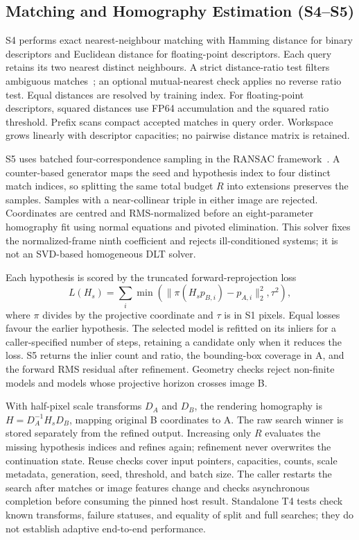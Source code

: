 \subsection{Matching and Homography Estimation (S4--S5)}
\label{sec:s4-s5}
S4 performs exact nearest-neighbour matching with Hamming distance for binary
descriptors and Euclidean distance for floating-point descriptors. Each query
retains its two nearest distinct neighbours. A strict distance-ratio test
filters ambiguous matches~\cite{lowe2004sift}; an optional mutual-nearest check
applies no reverse ratio test. Equal distances are resolved by training index.
For floating-point descriptors, squared distances use FP64 accumulation and
the squared ratio threshold. Prefix scans compact accepted matches in query
order. Workspace grows linearly with descriptor capacities; no pairwise
distance matrix is retained.

S5 uses batched four-correspondence sampling in the RANSAC
framework~\cite{fischler1981ransac}. A counter-based generator maps the seed and
hypothesis index to four distinct match indices, so splitting the same total
budget $R$ into extensions preserves the samples. Samples with a near-collinear
triple in either image are rejected. Coordinates are centred and RMS-normalized
before an eight-parameter homography fit using normal equations and pivoted
elimination. This solver fixes the normalized-frame ninth coefficient and
rejects ill-conditioned systems; it is not an SVD-based homogeneous DLT solver.

Each hypothesis is scored by the truncated forward-reprojection loss
\begin{equation}
 L(H_s)=\sum_i\min\!\left(\|\pi(H_s p_{B,i})-p_{A,i}\|_2^2,\tau^2\right),
\end{equation}
where $\pi$ divides by the projective coordinate and $\tau$ is in S1 pixels.
Equal losses favour the earlier hypothesis. The selected model is refitted
on its inliers for a caller-specified number of steps, retaining a candidate
only when it reduces the loss. S5 returns the inlier count and ratio, the
bounding-box coverage in A, and the forward RMS residual after refinement.
Geometry checks reject non-finite models and models whose projective horizon
crosses image B.

With half-pixel scale transforms $D_A$ and $D_B$, the rendering homography is
$H=D_A^{-1}H_sD_B$, mapping original B coordinates to A. The raw search winner
is stored separately from the refined output. Increasing only $R$ evaluates
the missing hypothesis indices and refines again; refinement never overwrites
the continuation state. Reuse checks cover input pointers, capacities, counts,
scale metadata, generation, seed, threshold, and batch size. The caller restarts
the search after matches or image features change and checks asynchronous
completion before consuming the pinned host result. Standalone T4 tests check known
transforms, failure statuses, and equality of split and full searches; they do
not establish adaptive end-to-end performance.
